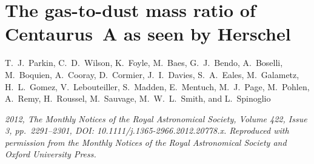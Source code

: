 \pagestyle{fancy}
\headheight 20pt
\chead{}
\lfoot{}
\cfoot{\thepage}
\rfoot{}
\renewcommand{\headrulewidth}{0.1pt}
\renewcommand{\footrulewidth}{0.1pt}


\chapter{The gas-to-dust mass ratio of Centaurus~A as seen by Herschel} \label{chapter2}

\thispagestyle{fancy}

\noindent T.~J.~Parkin, C.~D.~Wilson, K.~Foyle, M.~Baes, G.~J.~Bendo, A.~Boselli, M.~Boquien, A.~Cooray, D.~Cormier, J.~I.~Davies, S.~A.~Eales, M.~Galametz, H.~L.~Gomez, V.~Lebouteiller, S.~Madden, E.~Mentuch, M.~J.~Page, M.~Pohlen, A.~Remy, H.~Roussel, M.~Sauvage, M.~W.~L.~Smith, and L.~Spinoglio

\vspace{1.5cm}

\noindent \emph{2012, The Monthly Notices of the Royal Astronomical Society, Volume 422, Issue 3, pp.~2291--2301, DOI: 10.1111/j.1365-2966.2012.20778.x.  Reproduced with permission from the Monthly Notices of the Royal Astronomical Society and Oxford University Press.}


